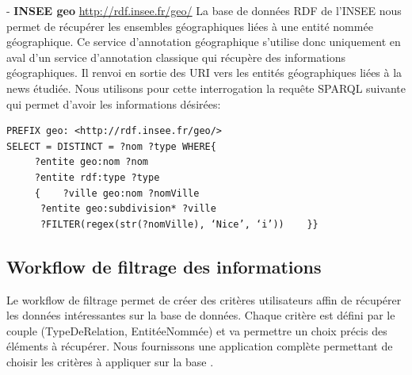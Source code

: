 \documentclass[]{easychair}
\newcommand{\comment}[4]{\par\noindent\hspace*{-0.5cm}{\parbox{\columnwidth}{\textbf{\color{#1}//#2[#3]:#4}}}\par}
\newcommand{\mi}[1]{\comment{blue}{}{#1}{MI}}
\begin{document}
- \textbf{INSEE geo} \url{http://rdf.insee.fr/geo/} La base de données RDF de l'INSEE nous permet de récupérer les ensembles géographiques liées à une entité nommée géographique. Ce service d'annotation géographique s'utilise donc uniquement en aval d'un service d'annotation classique qui récupère des informations géographiques. Il renvoi en sortie des URI vers les entités géographiques liées à la news étudiée. Nous utilisons pour cette interrogation la requête SPARQL suivante qui permet d'avoir les informations désirées:
\begin{verbatim}
PREFIX geo: <http://rdf.insee.fr/geo/>
SELECT = DISTINCT = ?nom ?type WHERE{
	 ?entite geo:nom ?nom
	 ?entite rdf:type ?type
	 { 	  ?ville geo:nom ?nomVille
      ?entite geo:subdivision* ?ville
      ?FILTER(regex(str(?nomVille), ‘Nice’, ‘i’))    }}
\end{verbatim}



\subsection{Workflow de filtrage des informations}
Le workflow de filtrage permet de créer des critères utilisateurs affin de récupérer les données intéressantes sur la base de données. Chaque critère est défini par le couple (TypeDeRelation, EntitéeNommée) et va permettre un choix précis des éléments à récupérer. Nous fournissons une application complète permettant de choisir les critères à appliquer sur la base \cite{Christophe}.

\end{document}
